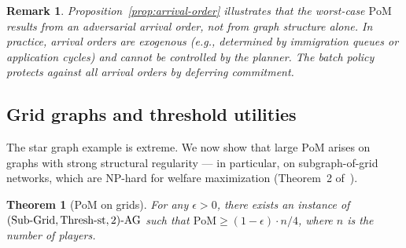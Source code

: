 \documentclass[11pt]{article}
\newtheorem{theorem}{Theorem}
\newtheorem{remark}{Remark}
\newcommand{\PoM}{\mathrm{PoM}}
\begin{document}
\begin{remark}
  Proposition~\ref{prop:arrival-order} illustrates that the worst-case $\PoM$
  results from an adversarial arrival order, not from graph structure alone.
  In practice, arrival orders are exogenous (e.g., determined by immigration queues or
  application cycles) and cannot be controlled by the planner.
  The batch policy protects against all arrival orders by deferring commitment.
\end{remark}

\subsection{Grid graphs and threshold utilities}

The star graph example is extreme.
We now show that large $\PoM$ arises on graphs with strong structural regularity ---
in particular, on subgraph-of-grid networks, which are NP-hard for welfare
maximization (Theorem~2 of~\cite{qiu2025welfare}).

\begin{theorem}[PoM on grids]
  \label{thm:grid-pom}
  For any $\epsilon > 0$, there exists an instance of
  $(\textup{Sub-Grid}, \textup{Thresh-st}, 2)\text{-}\mathrm{AG}$ such that
  $\PoM \geq (1-\epsilon) \cdot n / 4$,
  where $n$ is the number of players.
\end{theorem}
\end{document}
